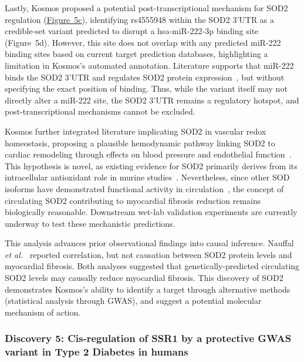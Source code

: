 \documentclass{article}
\begin{document}
Lastly, Kosmos proposed a potential post-transcriptional mechanism for SOD2 regulation (\hyperref[fig:fig5]{Figure~5c}), identifying rs4555948 within the SOD2 3'UTR as a credible-set variant predicted to disrupt a hsa-miR-222-3p binding site (Figure~5d). However, this site does not overlap with any predicted miR-222 binding sites based on current target prediction databases, highlighting a limitation in Kosmos’s automated annotation. Literature supports that miR-222 binds the SOD2 3'UTR and regulates SOD2 protein expression~\cite{dubois-deruy_micrornas_2017}, but without specifying the exact position of binding. Thus, while the variant itself may not directly alter a miR-222 site, the SOD2 3'UTR remains a regulatory hotspot, and post-transcriptional mechanisms cannot be excluded.

Kosmos further integrated literature implicating SOD2 in vascular redox homeostasis, proposing a plausible hemodynamic pathway linking SOD2 to cardiac remodeling through effects on blood pressure and endothelial function~\cite{arendshorst_oxidative_2024, fukai_superoxide_2011, dosunmu-ogunbi_role_2021}. This hypothesis is novel, as existing evidence for SOD2 primarily derives from its intracellular antioxidant role in murine studies~\cite{sharma_sod2_2020}. Nevertheless, since other SOD isoforms have demonstrated functional activity in circulation~\cite{kliment_extracellular_2009, jiang_superoxide_2024}, the concept of circulating SOD2 contributing to myocardial fibrosis reduction remains biologically reasonable. Downstream wet-lab validation experiments are currently underway to test these mechanistic predictions.

This analysis advances prior observational findings into causal inference. Nauffal \textit{et al.}~\cite{nauffal_genetics_2023} reported correlation, but not causation between SOD2 protein levels and myocardial fibrosis. Both analyses suggested that genetically-predicted circulating SOD2 levels may causally reduce myocardial fibrosis. This discovery of SOD2 demonstrates Kosmos’s ability to identify a target through alternative methods (statistical analysis through GWAS), and suggest a potential molecular mechanism of action.


\subsubsection{Discovery 5: Cis-regulation of SSR1 by a protective GWAS variant in Type 2 Diabetes in humans}
\end{document}

